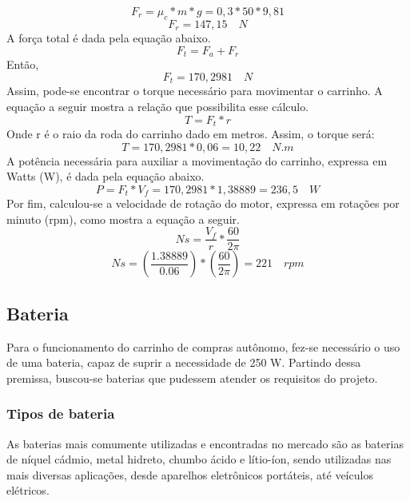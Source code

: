 $$ F_r = \mu_c*m*g = 0,3*50*9,81   $$
$$ F_r = 147,15 \quad N $$
		A força total é dada pela equação abaixo.
$$ F_t = F_a + F_r $$
Então,$$ F_t = 170,2981 \quad N   $$
		Assim, pode-se encontrar o torque necessário para movimentar o carrinho. A equação a seguir mostra a relação que possibilita esse cálculo.
$$ T = F_t*r $$
Onde r é o raio da roda do carrinho dado em metros. Assim, o torque será:
$$ T = 170,2981*0,06 = 10,22 \quad N.m $$
		A potência necessária para auxiliar a movimentação do carrinho, expressa em Watts (W), é dada pela equação abaixo.
$$ P = F_t*V_f = 170,2981*1,38889 = 236,5 \quad W $$
		Por fim, calculou-se a velocidade de rotação do motor, expressa em rotações por minuto (rpm), como mostra a equação a seguir.
$$ Ns = \frac{V_f}{r}*\frac{60}{2\pi} $$
$$ Ns = (\frac{1.38889}{0.06})*(\frac{60}{2\pi}) = 221 \quad rpm $$


\subsection {Bateria}
\par Para o funcionamento do carrinho de compras autônomo, fez-se necessário o uso de uma bateria, capaz de suprir a necessidade de 250 W. Partindo dessa premissa, buscou-se baterias que pudessem atender os requisitos do projeto.


\subsubsection {Tipos de bateria}
\par As baterias mais comumente utilizadas e encontradas no mercado são as baterias de níquel cádmio, metal hidreto, chumbo ácido e lítio-íon, sendo utilizadas nas mais diversas aplicações, desde aparelhos eletrônicos portáteis, até veículos elétricos.\cite{Costa}

